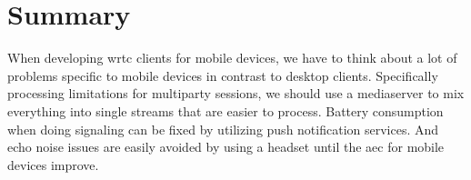 \section{Summary}
When developing \gls{wrtc} clients for mobile devices, we have to think about a lot of problems specific to mobile devices in contrast to desktop clients. Specifically processing limitations for multiparty sessions, we should use a mediaserver to mix everything into single streams that are easier to process. Battery consumption when doing signaling can be fixed by utilizing push notification services. And echo noise issues are easily avoided by using a headset until the \gls{aec} for mobile devices improve.